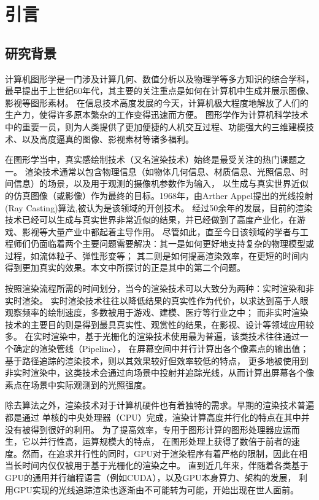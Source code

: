 \chapter{引言}
\label{cha:introduction}

\section{研究背景}

计算机图形学是一门涉及计算几何、数值分析以及物理学等多方知识的综合学科，最早提出于上世纪60年代，其主要的关注重点是如何在计算机中生成并展示图像、影视等图形素材。
在信息技术高度发展的今天，计算机极大程度地解放了人们的生产力，使得许多原本繁杂的工作变得迅速而方便。
图形学作为计算机科学技术中的重要一员，则为人类提供了更加便捷的人机交互过程、功能强大的三维建模技术、以及高度逼真的图像、影视素材等诸多福利。

在图形学当中，真实感绘制技术（又名渲染技术）始终是最受关注的热门课题之一。
渲染技术通常以包含物理信息（如物体几何信息、材质信息、光照信息、时间信息）的场景，以及用于观测的摄像机参数作为输入，
以生成与真实世界近似的仿真图像（或影像）作为最终的目标。1968年，由Arther Appel提出的光线投射(Ray Casting)算法\cite{???},被认为是该领域的开创技术。
经过50余年的发展，目前的渲染技术已经可以生成与真实世界非常近似的结果，并已经做到了高度产业化，在游戏、影视等大量产业中都起着主导作用。
尽管如此，直至今日该领域的学者与工程师们仍面临着两个主要问题需要解决：其一是如何更好地支持复杂的物理模型或过程，如流体粒子、弹性形变等；
其二则是如何提高渲染效率，在更短的时间内得到更加真实的效果。本文中所探讨的正是其中的第二个问题。

按照渲染流程所需的时间划分，当今的渲染技术可以大致分为两种：实时渲染和非实时渲染。
实时渲染技术往往以降低结果的真实性作为代价，以求达到高于人眼观察频率的绘制速度，多数被用于游戏、建模、医疗等行业之中；
而非实时渲染技术的主要目的则是得到最具真实性、观赏性的结果，在影视、设计等领域应用较多。
在实时渲染中，基于光栅化的渲染技术使用最为普遍，该类技术往往通过一个确定的渲染管线（Pipeline），
在屏幕空间中并行计算出各个像素点的输出值；基于路径追踪的渲染技术，则以其效果较好但效率较低的特点，
更多地被使用到非实时渲染中，这类技术会通过向场景中投射并追踪光线，从而计算出屏幕各个像素点在场景中实际观测到的光照强度。

除去算法之外，渲染技术对于计算机硬件也有着独特的需求。早期的渲染技术普遍都是通过
单核的中央处理器（CPU）完成，渲染计算高度并行化的特点在其中并没有被得到很好的利用。
为了提高效率，专用于图形计算的图形处理器应运而生，它以并行性高，运算规模大的特点，
在图形处理上获得了数倍于前者的速度。然而，在追求并行性的同时，GPU对于渲染程序有着严格的限制，因此在相当长时间内仅仅被用于基于光栅化的渲染之中。
直到近几年来，伴随着各类基于GPU的通用并行编程语言（例如CUDA），以及GPU本身算力、架构的发展，
利用GPU实现的光线追踪渲染也逐渐由不可能转为可能，开始出现在世人面前。

